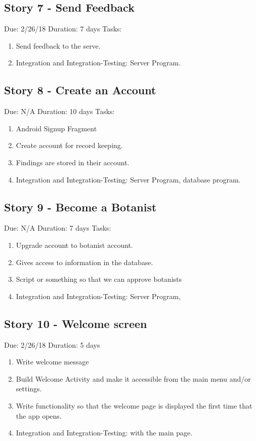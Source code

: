\documentclass[a4paper]{article}
\begin{document}
\subsection{Story 7 - Send Feedback}
Due: 2/26/18
\newline
Duration: 7 days 
\newline
Tasks:
\begin{enumerate}
\item Send feedback to the serve.
\item Integration and Integration-Testing: Server Program.
\end{enumerate}
\subsection{Story 8 - Create an Account}
Due: N/A
\newline
Duration: 10 days 
\newline
Tasks:
\begin{enumerate}
\item Android Signup Fragment
\item Create account for record keeping.
\item Findings are stored in their account.
\item Integration and Integration-Testing: Server Program, database program.
\end{enumerate}
\subsection{Story 9 - Become a Botanist}
Due: N/A
\newline
Duration: 7 days 
\newline
Tasks:
\begin{enumerate}
\item Upgrade account to botanist account.
\item Gives access to information in the database.
\item Script or something so that we can approve botanists
\item Integration and Integration-Testing: Server Program, 
\end{enumerate}
\subsection{Story 10 - Welcome screen}
Due: 2/26/18
\newline
Duration: 5 days 
\begin{enumerate}
\item Write welcome message
\item Build Welcome Activity and make it accessible from the main menu and/or settings.
\item Write functionality so that the welcome page is displayed the first time that the app opens.
\item Integration and Integration-Testing: with the main page.
\end{enumerate}
\end{document}
